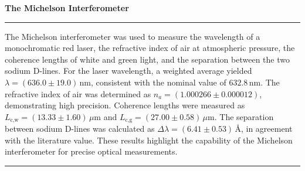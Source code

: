 \par
\begin{center}
{\Large\textbf{The Michelson Interferometer}}


    
\par\noindent\rule{\textwidth}{0.4pt}


The Michelson interferometer was used to measure the wavelength of a monochromatic red laser, the refractive index of air at atmospheric pressure, the coherence lengths of white and green light, and the separation between the two sodium D-lines. For the laser wavelength, a weighted average yielded \(\lambda = (636.0 \pm 19.0)\,\text{nm}\), consistent with the nominal value of \(632.8\,\text{nm}\). The refractive index of air was determined as \(n_a = (1.000266 \pm 0.000012)\), demonstrating high precision. Coherence lengths were measured as \(L_{\text{c,w}} = (13.33 \pm 1.60)\,\mu\text{m}\) and \(L_{\text{c,g}} = (27.00 \pm 0.58)\,\mu\text{m}\). The separation between sodium D-lines was calculated as \(\Delta \lambda = (6.41 \pm 0.53)\,\text{Å}\), in agreement with the literature value. These results highlight the capability of the Michelson interferometer for precise optical measurements.
    
    
    \par\noindent\rule{\textwidth}{0.4pt}
\end{center}

